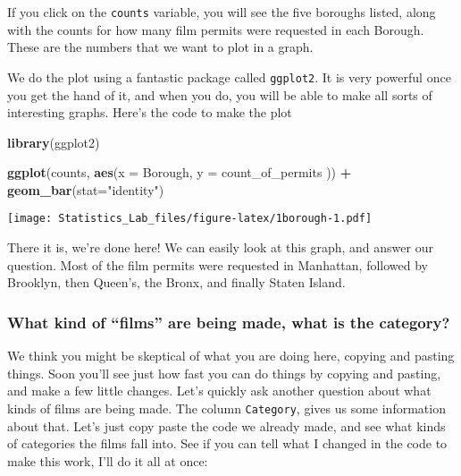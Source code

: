 \documentclass[
]{book}
\newenvironment{Shaded}{\begin{snugshade}}{\end{snugshade}}
\newcommand{\AttributeTok}[1]{\textcolor[rgb]{0.13,0.29,0.53}{#1}}
\newcommand{\FunctionTok}[1]{\textcolor[rgb]{0.13,0.29,0.53}{\textbf{#1}}}
\newcommand{\NormalTok}[1]{#1}
\newcommand{\SpecialCharTok}[1]{\textcolor[rgb]{0.81,0.36,0.00}{\textbf{#1}}}
\newcommand{\StringTok}[1]{\textcolor[rgb]{0.31,0.60,0.02}{#1}}
\begin{document}
If you click on the \texttt{counts} variable, you will see the five boroughs listed, along with the counts for how many film permits were requested in each Borough. These are the numbers that we want to plot in a graph.

We do the plot using a fantastic package called \texttt{ggplot2}. It is very powerful once you get the hand of it, and when you do, you will be able to make all sorts of interesting graphs. Here's the code to make the plot

\begin{Shaded}
\begin{Highlighting}[]
\FunctionTok{library}\NormalTok{(ggplot2)}

\FunctionTok{ggplot}\NormalTok{(counts, }\FunctionTok{aes}\NormalTok{(}\AttributeTok{x =}\NormalTok{ Borough, }\AttributeTok{y =}\NormalTok{ count\_of\_permits )) }\SpecialCharTok{+}
  \FunctionTok{geom\_bar}\NormalTok{(}\AttributeTok{stat=}\StringTok{"identity"}\NormalTok{)}
\end{Highlighting}
\end{Shaded}

\texttt{[image: Statistics\_Lab\_files/figure-latex/1borough-1.pdf]}

There it is, we're done here! We can easily look at this graph, and answer our question. Most of the film permits were requested in Manhattan, followed by Brooklyn, then Queen's, the Bronx, and finally Staten Island.

\hypertarget{what-kind-of-films-are-being-made-what-is-the-category}{%
\subsubsection{What kind of ``films'' are being made, what is the category?}\label{what-kind-of-films-are-being-made-what-is-the-category}}

We think you might be skeptical of what you are doing here, copying and pasting things. Soon you'll see just how fast you can do things by copying and pasting, and make a few little changes. Let's quickly ask another question about what kinds of films are being made. The column \texttt{Category}, gives us some information about that. Let's just copy paste the code we already made, and see what kinds of categories the films fall into. See if you can tell what I changed in the code to make this work, I'll do it all at once:
\end{document}
